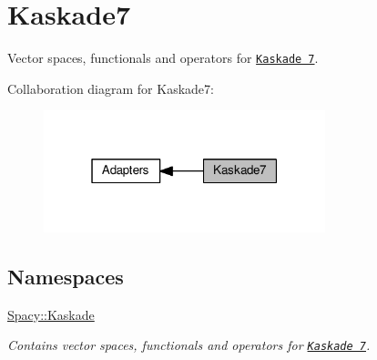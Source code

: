 \hypertarget{group__KaskadeGroup}{}\section{Kaskade7}
\label{group__KaskadeGroup}


Vector spaces, functionals and operators for \href{http://www.zib.de/projects/kaskade7-finite-element-toolbox}{\tt Kaskade 7}.  


Collaboration diagram for Kaskade7\+:\nopagebreak
\begin{figure}[H]
\begin{center}
\leavevmode
\includegraphics[width=232pt]{group__KaskadeGroup}
\end{center}
\end{figure}
\subsection*{Namespaces}
\begin{DoxyCompactItemize}
\item 
 \hyperlink{namespaceSpacy_1_1Kaskade}{Spacy\+::\+Kaskade}
\begin{DoxyCompactList}\small\item\em Contains vector spaces, functionals and operators for \href{http://www.zib.de/projects/kaskade7-finite-element-toolbox}{\tt Kaskade 7}. \end{DoxyCompactList}\end{DoxyCompactItemize}
